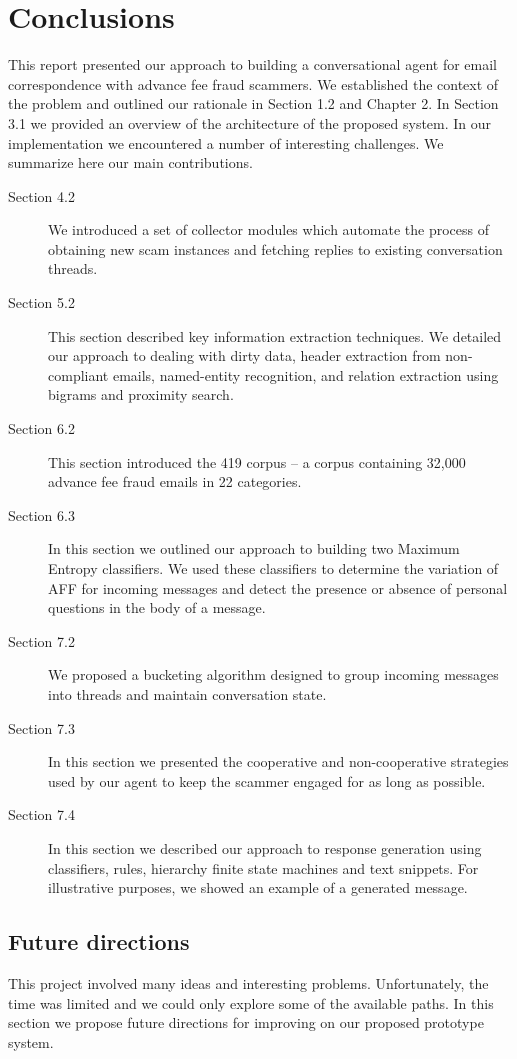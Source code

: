 \chapter{Conclusions}
This report presented our approach to building a conversational agent for email correspondence with advance fee fraud scammers.
We established the context of the problem and outlined our rationale in Section 1.2 and Chapter 2. In Section 3.1 we provided an
overview of the architecture of the proposed system. In our implementation we encountered a number of interesting challenges.
We summarize here our main contributions.
\begin{description}
\item[Section 4.2] We introduced a set of collector modules which automate the process of obtaining new scam instances and fetching replies to existing conversation threads.
\item[Section 5.2] This section described key information extraction techniques. We detailed our approach to dealing with dirty data, header extraction from non-compliant emails, named-entity recognition, and relation extraction using bigrams and proximity search.
\item[Section 6.2] This section introduced the 419 corpus -- a corpus containing 32,000 advance fee fraud emails in 22 categories.
\item[Section 6.3] In this section we outlined our approach to building two Maximum Entropy classifiers. We used these classifiers to determine the variation of AFF for incoming messages and detect the presence or absence of personal questions in the body of a message.
\item[Section 7.2] We proposed a bucketing algorithm designed to group incoming messages into threads and maintain conversation state.
\item[Section 7.3] In this section we presented the cooperative and non-cooperative strategies used by our agent to keep the scammer engaged for as long as possible.
\item[Section 7.4] In this section we described our approach to response generation using classifiers, rules, hierarchy finite state machines and text snippets. For illustrative purposes, we showed an example of a generated message.
\end{description}	

\section{Future directions}
This project involved many ideas and interesting problems. Unfortunately, the time was limited and we could only explore some of the available paths. In this section we propose future directions for improving on our proposed prototype system.


